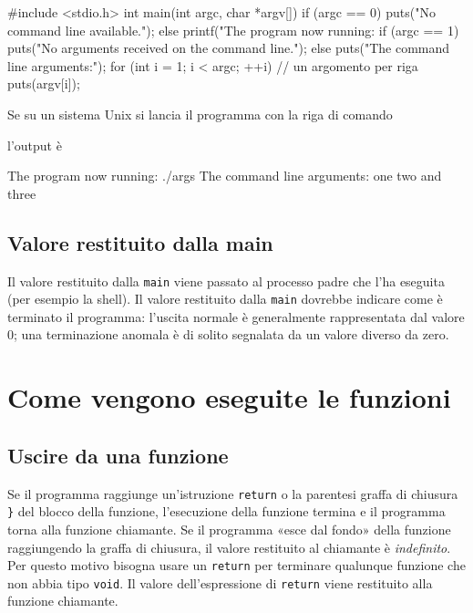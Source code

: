 \documentclass[11pt,a4paper]{article}
\begin{document}
\begin{esempio}
\begin{codice}
#include <stdio.h>
int main(int argc, char *argv[])
{
    if (argc == 0)
        puts("No command line available.");
    else {
        printf("The program now running: %
        if (argc == 1)
            puts("No arguments received on the command line.");
        else {
            puts("The command line arguments:");
            for (int i = 1; i < argc; ++i)    // un argomento per riga
                puts(argv[i]);
        }
    }
}
\end{codice}
Se su un sistema Unix si lancia il programma con la riga di comando
l'output è
\begin{risultato}
The program now running: ./args
The command line arguments:
one
two
and three
\end{risultato}
\end{esempio}

\subsection{Valore restituito dalla main}

Il valore restituito dalla \lstinline|main| viene passato al processo padre che l'ha eseguita (per esempio la shell). Il valore restituito dalla \lstinline|main| dovrebbe indicare come è terminato il programma: l'uscita normale è generalmente rappresentata dal valore $0$; una terminazione anomala è di solito segnalata da un valore diverso da zero.

\section{Come vengono eseguite le funzioni}

\subsection{Uscire da una funzione}

Se il programma raggiunge un'istruzione \lstinline|return| o la parentesi graffa di chiusura \lstinline|}| del blocco della funzione, l'esecuzione della funzione termina e il programma torna alla funzione chiamante. Se il programma «esce dal fondo» della funzione raggiungendo la graffa di chiusura, il valore restituito al chiamante è \emph{indefinito}. Per questo motivo bisogna usare un \lstinline|return| per terminare qualunque funzione che non abbia tipo \lstinline|void|. Il valore dell'espressione di \lstinline|return| viene restituito alla funzione chiamante.
\end{document}
